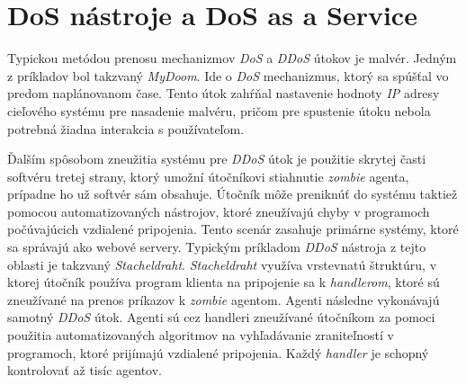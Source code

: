 \documentclass[
  digital, %
  table,   %
  lof,     %
  nolot,   %
  nocover
]{fithesis3}
\begin{document}


\section{DoS nástroje a DoS as a Service}
Typickou metódou prenosu mechanizmov \textit{DoS} a \textit{DDoS} útokov je malvér. Jedným z príkladov 
bol
takzvaný \textit{MyDoom}. Ide o \textit{DoS} mechanizmus, ktorý sa spúšťal vo predom naplánovanom čase.
Tento útok zahŕňal nastavenie hodnoty \textit{IP} adresy cieľového systému pre nasadenie malvéru,
pričom pre spustenie útoku nebola potrebná žiadna interakcia s používateľom.

Ďalším spôsobom zneužitia systému pre \textit{DDoS} útok je použitie skrytej časti softvéru tretej
strany, ktorý umožní útočníkovi stiahnutie \textit{zombie} agenta, prípadne ho už softvér sám obsahuje.
Útočník môže preniknúť do systému taktiež pomocou automatizovaných nástrojov, ktoré zneužívajú chyby v
programoch počúvajúcich vzdialené pripojenia. Tento scenár zasahuje primárne systémy, ktoré sa správajú
ako webové servery. Typickým príkladom \textit{DDoS} nástroja z tejto oblasti je takzvaný
\textit{Stacheldraht}. \textit{Stacheldraht} využíva vrstevnatú štruktúru, v ktorej útočník používa
program klienta na pripojenie sa k \textit{handlerom}, ktoré sú zneužívané na prenos príkazov
k \textit{zombie} agentom. Agenti následne vykonávajú samotný \textit{DDoS} útok. Agenti sú cez 
handleri
zneužívané útočníkom za pomoci použitia automatizovaných algoritmov na vyhľadávanie zraniteľností v
programoch, ktoré prijímajú vzdialené pripojenia. Každý \textit{handler} je schopný kontrolovať až 
tisíc
agentov. 
\end{document}
